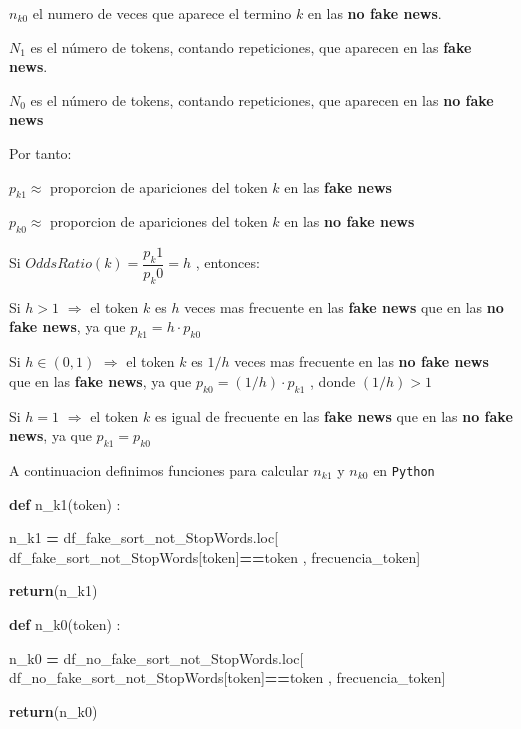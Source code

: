 \documentclass[
  11pt,
  a4paper,
]{article}
\newenvironment{Shaded}{\begin{snugshade}}{\end{snugshade}}
\newcommand{\ControlFlowTok}[1]{\textcolor[rgb]{0.13,0.29,0.53}{\textbf{#1}}}
\newcommand{\KeywordTok}[1]{\textcolor[rgb]{0.13,0.29,0.53}{\textbf{#1}}}
\newcommand{\NormalTok}[1]{#1}
\newcommand{\OperatorTok}[1]{\textcolor[rgb]{0.81,0.36,0.00}{\textbf{#1}}}
\newcommand{\StringTok}[1]{\textcolor[rgb]{0.31,0.60,0.02}{#1}}
\begin{document}
\(n_{k0}\) el numero de veces que aparece el termino \(k\) en las
\textbf{no fake news}.

\(N_1\) es el número de tokens, contando repeticiones, que aparecen en
las \textbf{fake news}.

\(N_0\) es el número de tokens, contando repeticiones, que aparecen en
las \textbf{no fake news}

Por tanto:

\(p_{k1} \approx\) proporcion de apariciones del token \(k\) en las
\textbf{fake news}

\(p_{k0} \approx\) proporcion de apariciones del token \(k\) en las
\textbf{no fake news}

Si \(OddsRatio(k) = \dfrac{ p_k1 }{ p_k0 } = h\) , entonces:

Si \(h>1\) \(\Rightarrow\) el token \(k\) es \(h\) veces mas frecuente
en las \textbf{fake news} que en las \textbf{no fake news}, ya que
\(p_{k1} = h \cdot p_{k0}\)

Si \(h \in (0 , 1)\) \(\Rightarrow\) el token \(k\) es \(1/h\) veces mas
frecuente en las \textbf{no fake news} que en las \textbf{fake news}, ya
que \(p_{k0} = (1/h) \cdot p_{k1}\) , donde \((1/h)>1\)

Si \(h= 1\) \(\Rightarrow\) el token \(k\) es igual de frecuente en las
\textbf{fake news} que en las \textbf{no fake news}, ya que
\(p_{k1} = p_{k0}\)

A continuacion definimos funciones para calcular \(n_{k1}\) y \(n_{k0}\)
en \texttt{Python}

\begin{Shaded}
\begin{Highlighting}[]
\KeywordTok{def}\NormalTok{ n\_k1(token) : }

\NormalTok{    n\_k1 }\OperatorTok{=}\NormalTok{ df\_fake\_sort\_not\_StopWords.loc[ df\_fake\_sort\_not\_StopWords[}\StringTok{\textquotesingle{}token\textquotesingle{}}\NormalTok{]}\OperatorTok{==}\NormalTok{token , }\StringTok{\textquotesingle{}frecuencia\_token\textquotesingle{}}\NormalTok{]}

    \ControlFlowTok{return}\NormalTok{(n\_k1)}
\end{Highlighting}
\end{Shaded}

\begin{Shaded}
\begin{Highlighting}[]
\KeywordTok{def}\NormalTok{ n\_k0(token) : }

\NormalTok{    n\_k0 }\OperatorTok{=}\NormalTok{ df\_no\_fake\_sort\_not\_StopWords.loc[ df\_no\_fake\_sort\_not\_StopWords[}\StringTok{\textquotesingle{}token\textquotesingle{}}\NormalTok{]}\OperatorTok{==}\NormalTok{token , }\StringTok{\textquotesingle{}frecuencia\_token\textquotesingle{}}\NormalTok{]}

    \ControlFlowTok{return}\NormalTok{(n\_k0)}
\end{Highlighting}
\end{Shaded}
\end{document}
